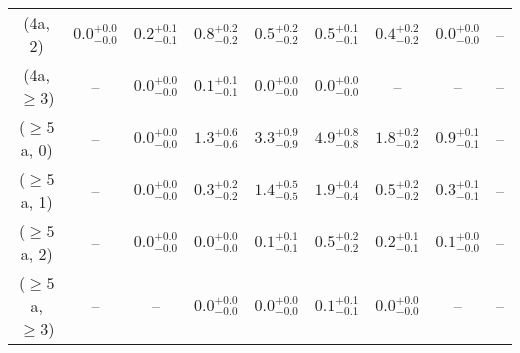 \begin{table}[h!]
{\begin{tabular}{ccccccccc}
	(4a, 2) & $0.0^{+ 0.0 }_{- 0.0 }$ & $0.2^{+ 0.1 }_{- 0.1 }$ & $0.8^{+ 0.2 }_{- 0.2 }$ & $0.5^{+ 0.2 }_{- 0.2 }$ & $0.5^{+ 0.1 }_{- 0.1 }$ & $0.4^{+ 0.2 }_{- 0.2 }$ & $0.0^{+ 0.0 }_{- 0.0 }$ & -- \\[0.5ex] 
	(4a, $\ge3$) & -- & $0.0^{+ 0.0 }_{- 0.0 }$ & $0.1^{+ 0.1 }_{- 0.1 }$ & $0.0^{+ 0.0 }_{- 0.0 }$ & $0.0^{+ 0.0 }_{- 0.0 }$ & -- & -- & -- \\[0.5ex] 
	($\ge5$a, 0) & -- & $0.0^{+ 0.0 }_{- 0.0 }$ & $1.3^{+ 0.6 }_{- 0.6 }$ & $3.3^{+ 0.9 }_{- 0.9 }$ & $4.9^{+ 0.8 }_{- 0.8 }$ & $1.8^{+ 0.2 }_{- 0.2 }$ & $0.9^{+ 0.1 }_{- 0.1 }$ & -- \\[0.5ex] 
	($\ge5$a, 1) & -- & $0.0^{+ 0.0 }_{- 0.0 }$ & $0.3^{+ 0.2 }_{- 0.2 }$ & $1.4^{+ 0.5 }_{- 0.5 }$ & $1.9^{+ 0.4 }_{- 0.4 }$ & $0.5^{+ 0.2 }_{- 0.2 }$ & $0.3^{+ 0.1 }_{- 0.1 }$ & -- \\[0.5ex] 
	($\ge5$a, 2) & -- & $0.0^{+ 0.0 }_{- 0.0 }$ & $0.0^{+ 0.0 }_{- 0.0 }$ & $0.1^{+ 0.1 }_{- 0.1 }$ & $0.5^{+ 0.2 }_{- 0.2 }$ & $0.2^{+ 0.1 }_{- 0.1 }$ & $0.1^{+ 0.0 }_{- 0.0 }$ & -- \\[0.5ex] 
	($\ge5$a, $\ge3$) & -- & -- & $0.0^{+ 0.0 }_{- 0.0 }$ & $0.0^{+ 0.0 }_{- 0.0 }$ & $0.1^{+ 0.1 }_{- 0.1 }$ & $0.0^{+ 0.0 }_{- 0.0 }$ & -- & -- \\[0.5ex] 
	\hline
	\hline
\end{tabular}}
\end{table}
